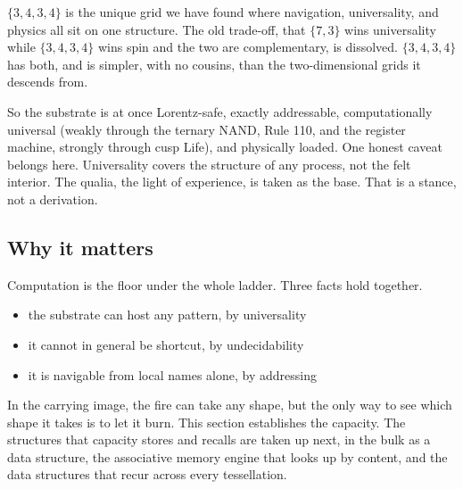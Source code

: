 \begin{result}
$\{3,4,3,4\}$ is the unique grid we have found where navigation, universality, and physics all sit on one structure. The old trade-off, that $\{7,3\}$ wins universality while $\{3,4,3,4\}$ wins spin and the two are complementary, is dissolved. $\{3,4,3,4\}$ has both, and is simpler, with no cousins, than the two-dimensional grids it descends from.
\end{result}

So the substrate is at once Lorentz-safe, exactly addressable, computationally universal (weakly through the ternary NAND, Rule 110, and the register machine, strongly through cusp Life), and physically loaded. One honest caveat belongs here. Universality covers the structure of any process, not the felt interior. The qualia, the light of experience, is taken as the base. That is a stance, not a derivation.

\subsection{Why it matters}

Computation is the floor under the whole ladder. Three facts hold together.

\begin{itemize}
\item the substrate can host any pattern, by universality
\item it cannot in general be shortcut, by undecidability
\item it is navigable from local names alone, by addressing
\end{itemize}

In the carrying image, the fire can take any shape, but the only way to see which shape it takes is to let it burn. This section establishes the capacity. The structures that capacity stores and recalls are taken up next, in the bulk as a data structure, the associative memory engine that looks up by content, and the data structures that recur across every tessellation.

